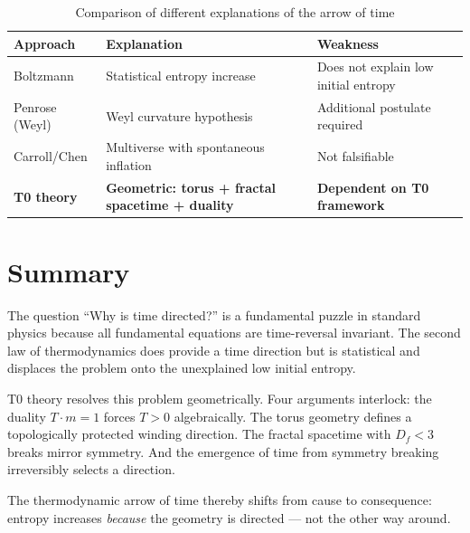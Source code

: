 \begin{table}[htbp]
	\centering
	\begin{tabular}{p{3.5cm}p{4.5cm}p{4.5cm}}
		\toprule
		\textbf{Approach} & \textbf{Explanation} & \textbf{Weakness} \\
		\midrule
		Boltzmann & Statistical entropy increase & Does not explain low initial entropy \\
		Penrose (Weyl) & Weyl curvature hypothesis & Additional postulate required \\
		Carroll/Chen & Multiverse with spontaneous inflation & Not falsifiable \\
		\textbf{T0 theory} & \textbf{Geometric: torus + fractal spacetime + duality} & \textbf{Dependent on T0 framework} \\
		\bottomrule
	\end{tabular}
	\caption{Comparison of different explanations of the arrow of time}
\end{table}

\section{Summary}

The question ``Why is time directed?'' is a fundamental puzzle in standard physics because all fundamental equations are time-reversal invariant. The second law of thermodynamics does provide a time direction but is statistical and displaces the problem onto the unexplained low initial entropy.

T0 theory resolves this problem geometrically. Four arguments interlock: the duality $T \cdot m = 1$ forces $T > 0$ algebraically. The torus geometry defines a topologically protected winding direction. The fractal spacetime with $D_f < 3$ breaks mirror symmetry. And the emergence of time from symmetry breaking irreversibly selects a direction.

The thermodynamic arrow of time thereby shifts from cause to consequence: entropy increases \emph{because} the geometry is directed --- not the other way around.

